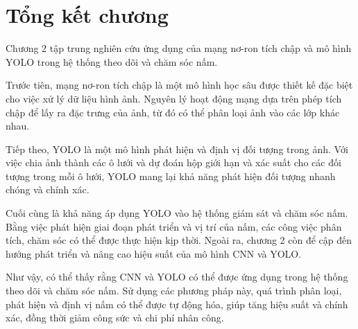 \section{Tổng kết chương}


Chương 2 tập trung nghiên cứu ứng dụng của mạng nơ-ron tích chập và mô hình YOLO trong hệ thống theo dõi và chăm sóc nấm.

Trước tiên, mạng nơ-ron tích chập là một mô hình học sâu được thiết kế đặc biệt cho việc xử lý dữ liệu hình ảnh. Nguyên lý hoạt động mạng dựa trên phép tích chập để lấy ra đặc trưng của ảnh, từ đó có thể phân loại ảnh vào các lớp khác nhau.

Tiếp theo, YOLO là một mô hình phát hiện và định vị đối tượng trong ảnh. Với việc chia ảnh thành các ô lưới và dự đoán hộp giới hạn và xác suất cho các đối tượng trong mỗi ô lưới, YOLO mang lại khả năng phát hiện đối tượng nhanh chóng và chính xác.

Cuối cùng là khả năng áp dụng YOLO vào hệ thống giám sát và chăm sóc nấm. Bằng việc phát hiện giai đoạn phát triển và vị trí của nấm, các công việc phân tích, chăm sóc có thể được thực hiện kịp thời. Ngoài ra, chương 2 còn để cập đến hướng phát triển và nâng cao hiệu suất của mô hình CNN và YOLO.

Như vậy, có thể thấy rằng CNN và YOLO có thể được ứng dụng trong hệ thống theo dõi và chăm sóc nấm. Sử dụng các phương pháp này, quá trình phân loại, phát hiện và định vị nấm có thể được tự động hóa, giúp tăng hiệu suất và chính xác, đồng thời giảm công sức và chi phí nhân công.

